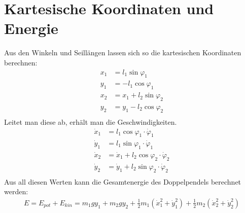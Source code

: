\documentclass[12pt,a4paper,titlepage,headinclude,bibtotoc]{scrartcl}
\begin{document}
\section{Kartesische Koordinaten und Energie}
Aus den Winkeln und Seillängen lassen sich so die kartesischen Koordinaten berechnen:
\begin{align*}
	x_1 &= l_1\sin\varphi_1\\
	y_1 &= -l_1\cos\varphi_1\\	
	x_2 &= x_1+l_2\sin\varphi_2\\
	y_2 &= y_1-l_2\cos\varphi_2\\
\end{align*}
Leitet man diese ab, erhält man die Geschwindigkeiten.
\begin{align*}
	\dot{x}_1 &= l_1\cos\varphi_1 \cdot \dot{\varphi}_1\\
	\dot{y}_1 &= l_1\sin\varphi_1 \cdot \dot{\varphi}_1\\	
	\dot{x}_2 &= \dot{x}_1 + l_2\cos\varphi_2 \cdot \dot{\varphi}_2\\
	\dot{y}_2 &= \dot{y}_1 + l_2\sin\varphi_2 \cdot \dot{\varphi}_2\\
\end{align*}
Aus all diesen Werten kann die Gesamtenergie des Doppelpendels berechnet werden:
\begin{align*}
	E = E_{pot}+E_{kin} = m_1gy_1+m_2gy_2 + \frac{1}{2}m_1\left(\dot{x}_1^2+\dot{y}_1^2\right) + \frac{1}{2}m_2\left(\dot{x}_2^2+\dot{y}_2^2\right)
\end{align*}
\end{document}
